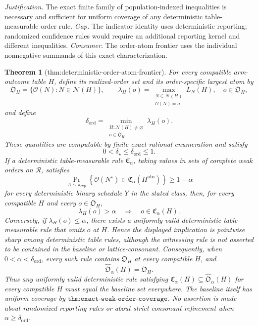 \documentclass{article}
\newtheorem{theorem}{Theorem}
\begin{document}
\par\smallskip\noindent \textit{Justification.} The exact finite family of population-indexed inequalities is necessary and sufficient for uniform coverage of any deterministic table-measurable order rule. \textit{Gap.} The indicator identity uses deterministic reporting; randomized confidence rules would require an additional reporting kernel and different inequalities. \textit{Consumer.} The order-atom frontier uses the individual nonnegative summands of this exact characterization.

\begin{theorem}[thm:deterministic-order-atom-frontier]\label{thm:deterministic-order-atom-frontier}
For every compatible arm-outcome table \(H\), define its realized-order set and its order-specific largest atom by
\[
 \mathfrak O_H=\{\mathcal O(N):N\in\mathcal N(H)\},
 \qquad
 \lambda_H(o)=
 \max_{\substack{N\in\mathcal N(H)\\ \mathcal O(N)=o}}L_N(H),
 \quad o\in\mathfrak O_H,
\]
and define
\[
 \delta_{\mathrm{ord}}
 =\min_{\substack{H:\mathcal N(H)\ne\varnothing\\
                   o\in\mathfrak O_H}}
 \lambda_H(o).
\]
These quantities are computable by finite exact-rational enumeration and satisfy
\[
 0<\delta_\star\le\delta_{\mathrm{ord}}\le1.
\]
If a deterministic table-measurable rule \(\mathfrak C_\alpha\), taking values in sets of complete weak orders on \(\mathcal R\), satisfies
\[
 \Pr_{A\sim\pi_{\exp}}\!\left\{\mathcal O(N^\star)\in
 \mathfrak C_\alpha(H^{\mathrm{obs}})\right\}\ge1-\alpha
\]
for every deterministic binary schedule \(Y\) in the stated class, then, for every compatible \(H\) and every \(o\in\mathfrak O_H\),
\[
 \lambda_H(o)>\alpha
 \quad\Longrightarrow\quad
 o\in\mathfrak C_\alpha(H).
\]
Conversely, if \(\lambda_H(o)\le\alpha\), there exists a uniformly valid deterministic table-measurable rule that omits \(o\) at \(H\). Hence the displayed implication is pointwise sharp among deterministic table rules, although the witnessing rule is not asserted to be contained in the baseline or lattice-consonant.
Consequently, when \(0<\alpha<\delta_{\mathrm{ord}}\), every such rule contains \(\mathfrak O_H\) at every compatible \(H\), and
\[
 \widehat{\mathfrak O}_\alpha(H)=\mathfrak O_H.
\]
Thus any uniformly valid deterministic rule satisfying \(\mathfrak C_\alpha(H)\subseteq\widehat{\mathfrak O}_\alpha(H)\) for every compatible \(H\) must equal the baseline set everywhere. The baseline itself has uniform coverage by \(\texttt{thm:exact-weak-order-coverage}\). No assertion is made about randomized reporting rules or about strict consonant refinement when \(\alpha\ge\delta_{\mathrm{ord}}\).
\end{theorem}
\end{document}
